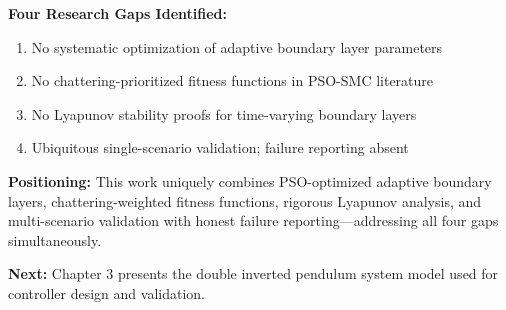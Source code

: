 \textbf{Four Research Gaps Identified:}
\begin{enumerate}
\item No systematic optimization of adaptive boundary layer parameters
\item No chattering-prioritized fitness functions in PSO-SMC literature
\item No Lyapunov stability proofs for time-varying boundary layers
\item Ubiquitous single-scenario validation; failure reporting absent
\end{enumerate}

\textbf{Positioning:} This work uniquely combines PSO-optimized adaptive boundary layers, chattering-weighted fitness functions, rigorous Lyapunov analysis, and multi-scenario validation with honest failure reporting—addressing all four gaps simultaneously.

\textbf{Next:} Chapter 3 presents the double inverted pendulum system model used for controller design and validation.
